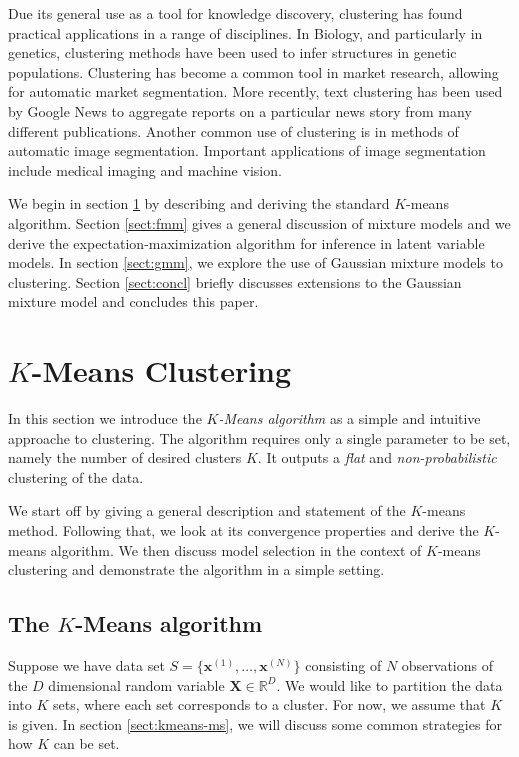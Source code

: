 \documentclass[final,3p,times,twocolumn]{elsarticle}
\let\bs\boldsymbol
\begin{document}
Due its general use as a tool for knowledge discovery, clustering has found practical applications in a range of disciplines.
In Biology, and particularly in genetics, clustering methods have been used to infer structures in genetic populations.
Clustering has become a common tool in market research, allowing for automatic market segmentation.
More recently, text clustering has been used by Google News to aggregate reports on a particular news story from many different publications.
Another common use of clustering is in methods of automatic image segmentation. Important applications of image segmentation include medical imaging and machine vision.

We begin in section \ref{sect:kmeans} by describing and deriving the standard $K$-means algorithm.
Section \ref{sect:fmm} gives a general discussion of mixture models and we derive the expectation-maximization algorithm for inference in latent variable models.
In section \ref{sect:gmm}, we explore the use of Gaussian mixture models to clustering.
Section \ref{sect:concl} briefly discusses extensions to the Gaussian mixture model and concludes this paper.

\section{$K$-Means Clustering}
\label{sect:kmeans}
In this section we introduce the \emph{$K$-Means algorithm} \cite{lloyd1982} as a simple and intuitive approache to clustering.
The algorithm requires only a single parameter to be set, namely the number of desired clusters $K$. 
It outputs a \emph{flat} and \emph{non-probabilistic} clustering of the data.

We start off by giving a general description and statement of the $K$-means method.
Following that, we look at its convergence properties and derive the $K$-means algorithm.
We then discuss model selection in the context of $K$-means clustering and demonstrate the algorithm in a simple setting.


\subsection{The $K$-Means algorithm}
Suppose we have data set $S = \{\bs x^{(1)},\dots,\bs x^{(N)}\}$ consisting of $N$ observations of the $D$ dimensional random variable $\bs X \in \mathbb{R}^D$.
We would like to partition the data into $K$ sets, where each set corresponds to a cluster.
For now, we assume that $K$ is given. In section \ref{sect:kmeans-ms}, we will discuss some common strategies for how $K$ can be set.
\end{document}
